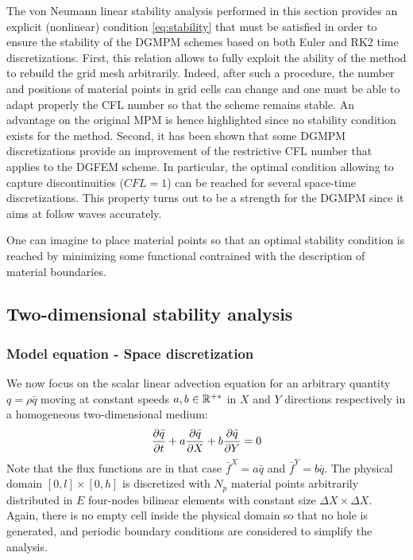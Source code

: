 The von Neumann linear stability analysis performed in this section provides an explicit (nonlinear) condition \eqref{eq:stability} that must be satisfied in order to ensure the stability of the DGMPM schemes based on both Euler and RK2 time discretizations. First, this relation allows to fully exploit the ability of the method to rebuild the grid mesh arbitrarily. Indeed, after such a procedure, the number and positions of material points in grid cells can change and one must be able to adapt properly the CFL number so that the scheme remains stable. An advantage on the original MPM is hence highlighted since no stability condition exists for the method. Second, it has been shown that some DGMPM discretizations provide an improvement of the restrictive CFL number that applies to the DGFEM scheme. In particular, the optimal condition allowing to capture discontinuities ($CFL=1$) can be reached for several space-time discretizations. This property turns out to be a strength for the DGMPM since it aims at follow waves accurately.

One can imagine to place material points so that an optimal stability condition is reached by minimizing some functional contrained with the description of material boundaries.

\subsection{Two-dimensional stability analysis}
\subsubsection*{Model equation - Space discretization}
We now focus on the scalar linear advection equation for an arbitrary quantity $q=\rho \bar{q}$ moving at constant speeds $a,b \in \mathbb{R}^{+*}$ in $X$ and $Y$ directions respectively in a homogeneous two-dimensional medium:
\begin{equation}
  \label{eq:2D_model_equation}
  \frac{\partial \bar{q}}{\partial t} + a\frac{\partial \bar{q}}{\partial X} + b\frac{\partial \bar{q}}{\partial Y}= 0
\end{equation}
Note that the flux functions are in that case $\bar{f}^X = a\bar{q}$ and $\bar{f}^Y = b\bar{q}$. The physical domain $[0,l]\times[0,h]$ is discretized with $N_p$ material points arbitrarily distributed in $E$ four-nodes bilinear elements with constant size $\Delta X \times \Delta X$. Again, there is no empty cell inside the physical domain so that no hole is generated, and periodic boundary conditions are considered to simplify the analysis.

